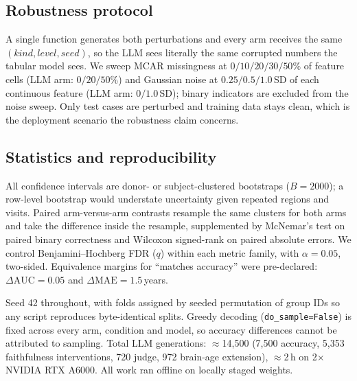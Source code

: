 \subsection{Robustness protocol}
\label{sec:method:robust}

A single function generates both perturbations and every arm receives the same
$(\textit{kind},\textit{level},\textit{seed})$, so the LLM sees literally the same corrupted numbers
the tabular model sees. We sweep MCAR missingness at $0/10/20/30/50\%$ of feature cells (LLM arm:
$0/20/50\%$) and Gaussian noise at $0.25/0.5/1.0$\,SD of each continuous feature (LLM arm:
$0/1.0$\,SD); binary indicators are excluded from the noise sweep. Only test cases are perturbed and
training data stays clean, which is the deployment scenario the robustness claim concerns.

\subsection{Statistics and reproducibility}
\label{sec:method:stats}

All confidence intervals are donor- or subject-clustered bootstraps ($B=2000$); a row-level
bootstrap would understate uncertainty given repeated regions and visits. Paired arm-versus-arm
contrasts resample the same clusters for both arms and take the difference inside the resample,
supplemented by McNemar's test on paired binary correctness and Wilcoxon signed-rank on paired
absolute errors. We control Benjamini--Hochberg FDR ($q$) within each metric family, with
$\alpha=0.05$, two-sided. Equivalence margins for ``matches accuracy'' were pre-declared:
$\Delta\text{AUC}=0.05$ and $\Delta\text{MAE}=1.5$\,years.

Seed 42 throughout, with folds assigned by seeded permutation of group IDs so any script reproduces
byte-identical splits. Greedy decoding (\texttt{do\_sample=False}) is fixed across every arm,
condition and model, so accuracy differences cannot be attributed to sampling. Total LLM
generations: $\approx$14{,}500 (7{,}500 accuracy, 5{,}353 faithfulness interventions, 720 judge, 972
brain-age extension), $\approx$2\,h on 2$\times$NVIDIA RTX A6000. All work ran offline on locally
staged weights.
